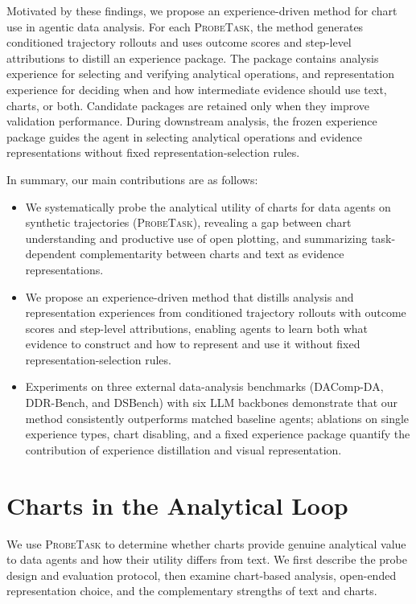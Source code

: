 \documentclass{article}
\newcommand{\probe}{\textsc{ProbeTask}}
\begin{document}
Motivated by these findings, we propose an experience-driven method for chart use in agentic data analysis.
For each \probe{}, the method generates conditioned trajectory rollouts and uses outcome scores and step-level attributions to distill an experience package.
The package contains analysis experience for selecting and verifying analytical operations, and representation experience for deciding when and how intermediate evidence should use text, charts, or both.
Candidate packages are retained only when they improve validation performance.
During downstream analysis, the frozen experience package guides the agent in selecting analytical operations and evidence representations without fixed representation-selection rules.

In summary, our main contributions are as follows:
\begin{itemize}
  \item We systematically probe the analytical utility of charts for data agents on synthetic trajectories (\probe{}), revealing a gap between chart understanding and productive use of open plotting, and summarizing task-dependent complementarity between charts and text as evidence representations.
  \item We propose an experience-driven method that distills analysis and representation experiences from conditioned trajectory rollouts with outcome scores and step-level attributions, enabling agents to learn both what evidence to construct and how to represent and use it without fixed representation-selection rules.
  \item Experiments on three external data-analysis benchmarks (DAComp-DA, DDR-Bench, and DSBench) with six LLM backbones demonstrate that our method consistently outperforms matched baseline agents; ablations on single experience types, chart disabling, and a fixed experience package quantify the contribution of experience distillation and visual representation.
\end{itemize}



\section{Charts in the Analytical Loop}
\label{sec:probe}

We use \probe{} to determine whether charts provide genuine analytical value to data agents and how their utility differs from text.
We first describe the probe design and evaluation protocol, then examine chart-based analysis, open-ended representation choice, and the complementary strengths of text and charts.
\end{document}

